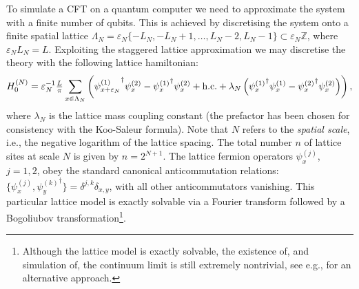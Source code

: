\documentclass[12pt]{article}
\newcommand{\1}{\mathds{1}}
\begin{document}
To simulate a CFT on a quantum computer we need to approximate the system with a finite number of qubits. This is achieved by discretising the system onto a finite spatial lattice $\Lambda_{N} = \varepsilon_{N}\{-L_{N}, -L_{N} +1, \ldots, L_{N}-2, L_{N}-1\}\subset\varepsilon_{N}  \mathbb{Z}$, where $\varepsilon_NL_{N} = L$. 
Exploiting the staggered lattice approximation we may discretise the theory with the following lattice hamiltonian:
\begin{equation}
\label{eq:stagH}
H^{(N)}_{0} = \varepsilon_{N}^{-1}\tfrac{L}{\pi}\sum_{x\in\Lambda_{N}}\left({\psi^{(1)}_{x+\varepsilon_{N}}}^\dagger{\psi^{(2)}_{x}} - {\psi^{(1)}_{x}}^\dagger{\psi^{(2)}_{x}} + \textup{h.c.} + \lambda_{N}\left({\psi^{(1)}_{x}}^\dagger {\psi^{(1)}_{x}} - {\psi^{(2)}_{x}}^\dagger{\psi^{(2)}_{x}}\right)\right),
\end{equation}
where $\lambda_N$ is the lattice mass coupling constant (the prefactor has been chosen for consistency with the Koo-Saleur formula). Note that $N$ refers to the \emph{spatial scale}, i.e., the negative logarithm of the lattice spacing. The total number $n$ of lattice sites at scale $N$ is given by $n=2^{N+1}$. The lattice fermion operators $\psi^{(j)}_x$, $j=1,2$, obey the standard canonical anticommutation relations: $\{\psi^{(j)}_x, {\psi^{(k)}_y}^\dagger\} = \delta^{j,k}\delta_{x,y}$, with all other anticommutators vanishing. This particular lattice model is exactly solvable via a Fourier transform followed by a Bogoliubov transformation\footnote{Although the lattice model is exactly solvable, the existence of, and simulation of, the continuum limit is still extremely nontrivial, see e.g., \cite{ziniConformalFieldTheories2018} for an alternative approach.}.
\end{document}
